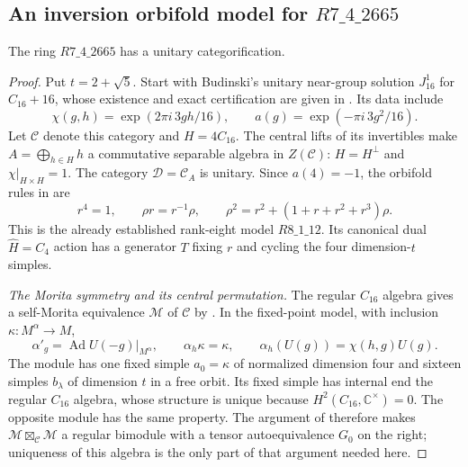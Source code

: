 \subsection{An inversion orbifold model for \texorpdfstring{$R7\_4\_2665$}{R7-4-2665}}
\label{sec:inversion-orbifold}

\begin{theorem}\label{thm:inversion-orbifold}
The ring $R7\_4\_2665$ has a unitary categorification.
\end{theorem}
\begin{proof}
Put $t=2+\sqrt5$. Start with Budinski's unitary near-group solution
$J_{16}^1$ for $C_{16}+16$, whose existence and exact certification are
given in \cite[Theorem~3.1.1, Table~3.1 and Section~3.3.2]{Budinski}.
Its data include
\[
 \chi(g,h)=\exp(2\pi i\,3gh/16),\qquad
 a(g)=\exp(-\pi i\,3g^2/16).
\]
Let $\mathcal C$ denote this category and $H=4C_{16}$. The central lifts
of its invertibles make $A=\bigoplus_{h\in H}h$ a commutative separable
algebra in $Z(\mathcal C)$: $H=H^\perp$ and $\chi|_{H\times H}=1$.
The category $\mathcal D=\mathcal C_A$ is unitary. Since $a(4)=-1$,
the orbifold rules in \cite[Theorem~12.5]{IzumiNear} are
\begin{equation}\label{eq:inversion-neutral}
 r^4=1,\qquad \rho r=r^{-1}\rho,\qquad
 \rho^2=r^2+(1+r+r^2+r^3)\rho.
\end{equation}
This is the already established rank-eight model $R8\_1\_12$.
Its canonical dual $\widehat H=C_4$ action has a generator $T$ fixing
$r$ and cycling the four dimension-$t$ simples.

\emph{The Morita symmetry and its central permutation.}
The regular $C_{16}$ algebra gives a self-Morita equivalence
$\mathcal M$ of $\mathcal C$ by \cite[Theorem~11.3]{IzumiNear}.
In the fixed-point model, with inclusion $\kappa:M^\alpha\to M$,
\[
 \alpha'_g=\operatorname{Ad}U(-g)|_{M^\alpha},\qquad
 \alpha_h\kappa=\kappa,\qquad
 \alpha_h(U(g))=\chi(h,g)U(g).
\]
The module has one fixed simple $a_0=\kappa$ of normalized dimension
four and sixteen simples $b_\lambda$ of dimension $t$ in a free orbit.
Its fixed simple has internal end the regular $C_{16}$ algebra, whose
structure is unique because $H^2(C_{16},\mathbb C^\times)=0$.
The opposite module has the same property. The argument of
\cite[Lemma~4.7 and Remark~4.8]{GJSCyclic} therefore makes
$\mathcal M\boxtimes_{\mathcal C}\mathcal M$ a regular bimodule with
a tensor autoequivalence $G_0$ on the right; uniqueness of this algebra
is the only part of that argument needed here.


\end{proof}
